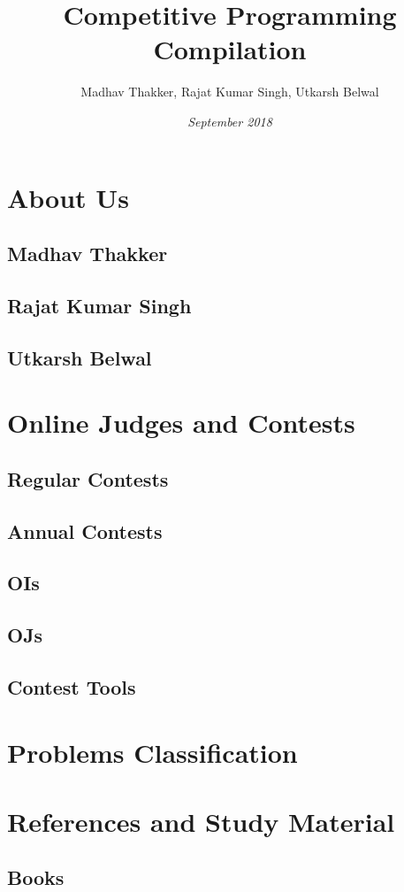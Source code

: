 \documentclass{report}
\title{\textbf{Competitive Programming Compilation}}
\author{Madhav Thakker, Rajat Kumar Singh, Utkarsh Belwal}
\date{\textit{September 2018}}
\begin{document}
\maketitle

\tableofcontents

\chapter{About Us}
    \section{Madhav Thakker}
    \section{Rajat Kumar Singh}
    \section{Utkarsh Belwal}
\chapter{Online Judges and Contests}
    \section{Regular Contests}
    \section{Annual Contests}
    \section{OIs}
    \section{OJs}
    \section{Contest Tools}
\chapter{Problems Classification}
\chapter{References and Study Material}
    \section{Books}
\end{document}
